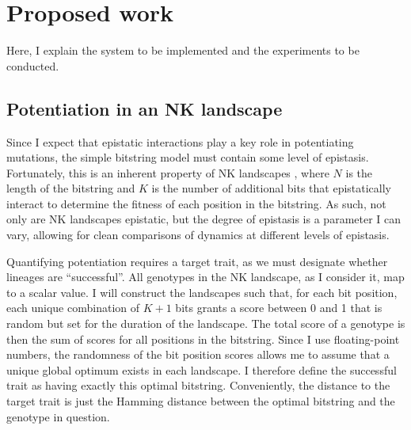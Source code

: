 \section{Proposed work}

Here, I explain the system to be implemented and the experiments to be conducted.

\subsection{Potentiation in an NK landscape}

Since I expect that epistatic interactions play a key role in potentiating mutations, the simple bitstring model must contain some level of epistasis. 
Fortunately, this is an inherent property of NK landscapes \citep{kauffmanGeneralTheoryAdaptive1987}, where $N$ is the length of the bitstring and $K$ is the number of additional bits that epistatically interact to determine the fitness of each position in the bitstring. 
As such, not only are NK landscapes epistatic, but the degree of epistasis is a parameter I can vary, allowing for clean comparisons of dynamics at different levels of epistasis. 

Quantifying potentiation requires a target trait, as we must designate whether lineages are ``successful''. 
All genotypes in the NK landscape, as I consider it, map to a scalar value. 
I will construct the landscapes such that, for each bit position, each unique combination of $K + 1$ bits grants a score between 0 and 1 that is random but set for the duration of the landscape. 
The total score of a genotype is then the sum of scores for all positions in the bitstring. 
Since I use floating-point numbers, the randomness of the bit position scores allows me to assume that a unique global optimum exists in each landscape. 
I therefore define the successful trait as having exactly this optimal bitstring. 
Conveniently, the distance to the target trait is just the Hamming distance between the optimal bitstring and the genotype in question. 


